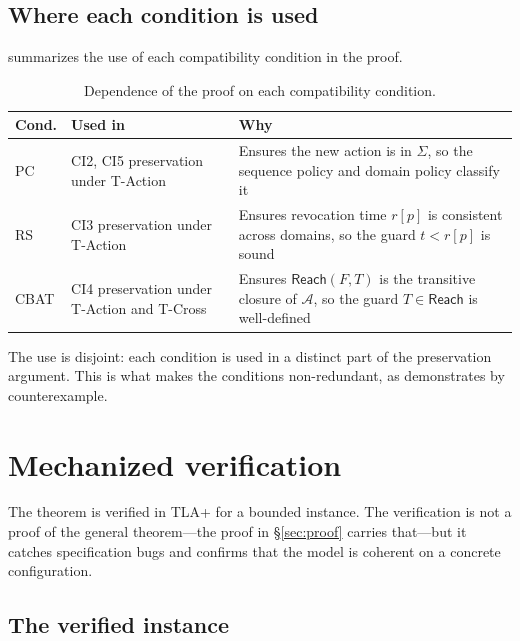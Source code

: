 \documentclass[11pt,a4paper]{article}
\theoremstyle{plain}
\theoremstyle{definition}
\theoremstyle{remark}
\begin{document}
\subsection{Where each condition is used}

 summarizes the use of each compatibility condition
in the proof.

\begin{table}[t]
\centering
\small
\begin{tabular}{@{}p{1.2cm}p{5.5cm}p{7cm}@{}}
\toprule
\textbf{Cond.} & \textbf{Used in} & \textbf{Why} \\
\midrule
PC & CI2, CI5 preservation under T-Action & Ensures the new action is in $\Sigma$, so the sequence policy and domain policy classify it \\
RS & CI3 preservation under T-Action & Ensures revocation time $r[p]$ is consistent across domains, so the guard $t < r[p]$ is sound \\
CBAT & CI4 preservation under T-Action and T-Cross & Ensures $\mathsf{Reach}(F, T)$ is the transitive closure of $\mathcal{A}$, so the guard $T \in \mathsf{Reach}$ is well-defined \\
\bottomrule
\end{tabular}
\caption{Dependence of the proof on each compatibility condition.}
\label{tab:conditions-use}
\end{table}

The use is disjoint: each condition is used in a distinct part of the
preservation argument. This is what makes the conditions non-redundant, as
 demonstrates by counterexample.

\section{Mechanized verification}
\label{sec:verification}

The theorem is verified in TLA+ for a bounded instance. The verification is
not a proof of the general theorem---the proof in \S\ref{sec:proof} carries
that---but it catches specification bugs and confirms that the model is
coherent on a concrete configuration.

\subsection{The verified instance}
\end{document}
